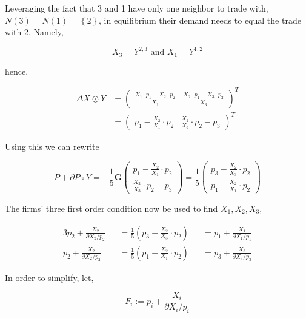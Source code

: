 \documentclass[american]{scrartcl}
\newcommand{\matr}[1]{\bm{#1}}
\newcommand{\set}[1]{\left\{#1\right\}}
\begin{document}
Leveraging the fact that 3 and 1 have only one neighbor to trade with, $N(3) = N(1) = \set{2}$, in equilibrium their demand needs to equal the trade with 2. Namely,

\begin{equation}
	X_3 = Y^{2, 3} \text{ and } X_1 = Y^{1, 2}
\end{equation}

hence,

\begin{equation}
	\begin{split}
		\Delta X \oslash Y &= \begin{pmatrix}
			\frac{X_1 \cdot p_1 - X_2 \cdot p_2}{X_1} &
			\frac{X_2 \cdot p_1 - X_3 \cdot p_2}{X_3}
		\end{pmatrix}^{T} \\
		&= \begin{pmatrix}
			p_1 - \frac{X_2}{X_1} \cdot p_2 &
			\frac{X_2}{X_3} \cdot p_2 - p_3
		\end{pmatrix}^{T}
	\end{split}
\end{equation}

Using this we can rewrite

\begin{equation}
	P + \partial P \circ Y = - \frac{1}{5} \matr{G} \begin{pmatrix}
		p_1 - \frac{X_2}{X_1} \cdot p_2 \\
		\frac{X_2}{X_3} \cdot p_2 - p_3
	\end{pmatrix} = \frac{1}{5} \begin{pmatrix}
		p_3 - \frac{X_2}{X_3} \cdot p_2 \\
		p_1 - \frac{X_2}{X_1} \cdot p_2
	\end{pmatrix}
\end{equation}

The firms' three first order condition now be used to find $X_1, X_2, X_3$,

\begin{alignat*}{3}
	p_2 + \frac{X_2}{\partial X_2 / p_2} &  & = \frac{1}{5} \left( p_3 - \frac{X_2}{X_3} \cdot p_2  \right) &  & = p_1 + \frac{X_1}{\partial X_1 / p_1} \\
	p_2 + \frac{X_2}{\partial X_2 / p_2} &  & = \frac{1}{5} \left( p_1 - \frac{X_2}{X_1} \cdot p_2  \right) &  & = p_3 + \frac{X_3}{\partial X_3 / p_3}
\end{alignat*}

In order to simplify, let,

\begin{equation}
	F_i := p_i +  \frac{X_i}{\partial X_i / p_i}
\end{equation}
\end{document}
